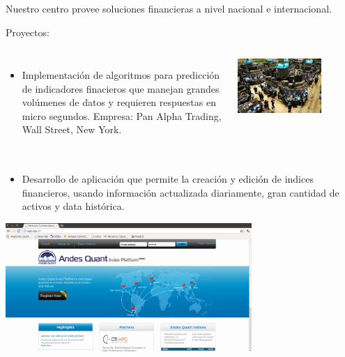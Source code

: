 \frame
{
\frametitle{}

Nuestro centro provee soluciones financieras a nivel nacional e internacional.

Proyectos:


\begin{columns}
\begin{itemize}
\item Implementación de algoritmos para predicción de indicadores finacieros que manejan grandes volúmenes de datos y requieren respuestas en micro segundos. Empresa: Pan Alpha Trading, Wall Street, New York.
\end{itemize}
\includegraphics[width=0.7\textwidth]{img/wallstreet}
\end{columns}

}

\frame
{
\frametitle{}

\begin{itemize}
\item Desarrollo de aplicación que permite la creación y edición de indices financieros, usando información actualizada diariamente, gran cantidad de activos y data histórica.
\end{itemize}
\begin{center}
 \includegraphics[width=0.7\textwidth]{img/ETF}
\end{center}





}

